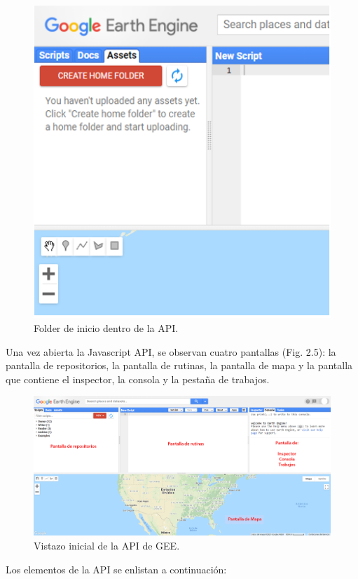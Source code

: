 \documentclass[
  12pt,
  letterpaper,
  twoside]{book}
\begin{document}
\begin{figure}[btp]

{\centering \includegraphics[width=0.6\linewidth]{Img/homeFolder} 

}

\caption{Folder de inicio dentro de la API.}\label{fig:unnamed-chunk-5}
\end{figure}

Una vez abierta la Javascript API, se observan cuatro pantallas (Fig. 2.5): la pantalla de repositorios, la pantalla de rutinas, la pantalla de mapa y la pantalla que contiene el inspector, la consola y la pestaña de trabajos.

\begin{figure}[btp]

{\centering \includegraphics[width=1\linewidth]{Img/GEE_inicio_API} 

}

\caption{Vistazo inicial de la API de GEE.}\label{fig:unnamed-chunk-6}
\end{figure}

Los elementos de la API se enlistan a continuación:
\end{document}
